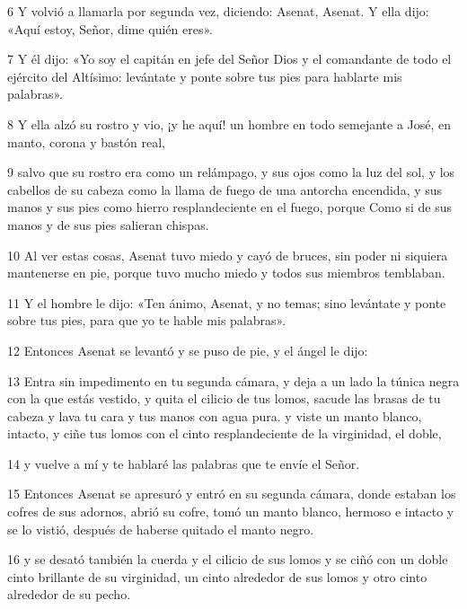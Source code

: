 \par 6 Y volvió a llamarla por segunda vez, diciendo: Asenat, Asenat. Y ella dijo: «Aquí estoy, Señor, dime quién eres».

\par 7 Y él dijo: «Yo soy el capitán en jefe del Señor Dios y el comandante de todo el ejército del Altísimo: levántate y ponte sobre tus pies para hablarte mis palabras».

\par 8 Y ella alzó su rostro y vio, ¡y he aquí! un hombre en todo semejante a José, en manto, corona y bastón real,

\par 9 salvo que su rostro era como un relámpago, y sus ojos como la luz del sol, y los cabellos de su cabeza como la llama de fuego de una antorcha encendida, y sus manos y sus pies como hierro resplandeciente en el fuego, porque Como si de sus manos y de sus pies salieran chispas.

\par 10 Al ver estas cosas, Asenat tuvo miedo y cayó de bruces, sin poder ni siquiera mantenerse en pie, porque tuvo mucho miedo y todos sus miembros temblaban.

\par 11 Y el hombre le dijo: «Ten ánimo, Asenat, y no temas; sino levántate y ponte sobre tus pies, para que yo te hable mis palabras».

\par 12 Entonces Asenat se levantó y se puso de pie, y el ángel le dijo:

\par 13 Entra sin impedimento en tu segunda cámara, y deja a un lado la túnica negra con la que estás vestido, y quita el cilicio de tus lomos, sacude las brasas de tu cabeza y lava tu cara y tus manos con agua pura. y viste un manto blanco, intacto, y ciñe tus lomos con el cinto resplandeciente de la virginidad, el doble,

\par 14 y vuelve a mí y te hablaré las palabras que te envíe el Señor.

\par 15 Entonces Asenat se apresuró y entró en su segunda cámara, donde estaban los cofres de sus adornos, abrió su cofre, tomó un manto blanco, hermoso e intacto y se lo vistió, después de haberse quitado el manto negro.

\par 16 y se desató también la cuerda y el cilicio de sus lomos y se ciñó con un doble cinto brillante de su virginidad, un cinto alrededor de sus lomos y otro cinto alrededor de su pecho.

